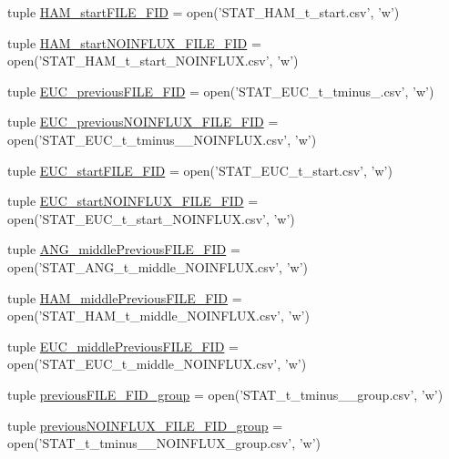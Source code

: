 \begin{DoxyCompactItemize}
\item 
tuple \hyperlink{a00098_abb14887e587e1107fc13046ad313077e}{H\-A\-M\-\_\-start\-F\-I\-L\-E\-\_\-\-F\-I\-D} = open('S\-T\-A\-T\-\_\-\-H\-A\-M\-\_\-t\-\_\-start.\-csv', 'w')
\item 
tuple \hyperlink{a00098_ab8a3b402c0b418cc290889a5f6482280}{H\-A\-M\-\_\-start\-N\-O\-I\-N\-F\-L\-U\-X\-\_\-\-F\-I\-L\-E\-\_\-\-F\-I\-D} = open('S\-T\-A\-T\-\_\-\-H\-A\-M\-\_\-t\-\_\-start\-\_\-\-N\-O\-I\-N\-F\-L\-U\-X.\-csv', 'w')
\item 
tuple \hyperlink{a00098_a3548edac9afffda077dcbd2876616b39}{E\-U\-C\-\_\-previous\-F\-I\-L\-E\-\_\-\-F\-I\-D} = open('S\-T\-A\-T\-\_\-\-E\-U\-C\-\_\-t\-\_\-tminus\-\_.\-csv', 'w')
\item 
tuple \hyperlink{a00098_aa2efc59329473a7bbeaf3ce32ec4dc3d}{E\-U\-C\-\_\-previous\-N\-O\-I\-N\-F\-L\-U\-X\-\_\-\-F\-I\-L\-E\-\_\-\-F\-I\-D} = open('S\-T\-A\-T\-\_\-\-E\-U\-C\-\_\-t\-\_\-tminus\-\_\-\_\-\-N\-O\-I\-N\-F\-L\-U\-X.\-csv', 'w')
\item 
tuple \hyperlink{a00098_a3d812ff298612e6aae54e7a9abfddbf2}{E\-U\-C\-\_\-start\-F\-I\-L\-E\-\_\-\-F\-I\-D} = open('S\-T\-A\-T\-\_\-\-E\-U\-C\-\_\-t\-\_\-start.\-csv', 'w')
\item 
tuple \hyperlink{a00098_a8ae5873fd9b162495a512e314047e930}{E\-U\-C\-\_\-start\-N\-O\-I\-N\-F\-L\-U\-X\-\_\-\-F\-I\-L\-E\-\_\-\-F\-I\-D} = open('S\-T\-A\-T\-\_\-\-E\-U\-C\-\_\-t\-\_\-start\-\_\-\-N\-O\-I\-N\-F\-L\-U\-X.\-csv', 'w')
\item 
tuple \hyperlink{a00098_aa5eb16eef2c90e2ccc991eb176280f21}{A\-N\-G\-\_\-middle\-Previous\-F\-I\-L\-E\-\_\-\-F\-I\-D} = open('S\-T\-A\-T\-\_\-\-A\-N\-G\-\_\-t\-\_\-middle\-\_\-\-N\-O\-I\-N\-F\-L\-U\-X.\-csv', 'w')
\item 
tuple \hyperlink{a00098_aaf0dd6e74d88a7cf2e909301b422c17d}{H\-A\-M\-\_\-middle\-Previous\-F\-I\-L\-E\-\_\-\-F\-I\-D} = open('S\-T\-A\-T\-\_\-\-H\-A\-M\-\_\-t\-\_\-middle\-\_\-\-N\-O\-I\-N\-F\-L\-U\-X.\-csv', 'w')
\item 
tuple \hyperlink{a00098_afcb9ec3ed11cfcacae8f796af7605425}{E\-U\-C\-\_\-middle\-Previous\-F\-I\-L\-E\-\_\-\-F\-I\-D} = open('S\-T\-A\-T\-\_\-\-E\-U\-C\-\_\-t\-\_\-middle\-\_\-\-N\-O\-I\-N\-F\-L\-U\-X.\-csv', 'w')
\item 
tuple \hyperlink{a00098_a9e72c152be1f5aac24af10b353b16390}{previous\-F\-I\-L\-E\-\_\-\-F\-I\-D\-\_\-group} = open('S\-T\-A\-T\-\_\-t\-\_\-tminus\-\_\-\_\-group.\-csv', 'w')
\item 
tuple \hyperlink{a00098_a648b56a19ba8992cdb56d307ed22eb41}{previous\-N\-O\-I\-N\-F\-L\-U\-X\-\_\-\-F\-I\-L\-E\-\_\-\-F\-I\-D\-\_\-group} = open('S\-T\-A\-T\-\_\-t\-\_\-tminus\-\_\-\_\-\-N\-O\-I\-N\-F\-L\-U\-X\-\_\-group.\-csv', 'w')

\end{DoxyCompactItemize}
